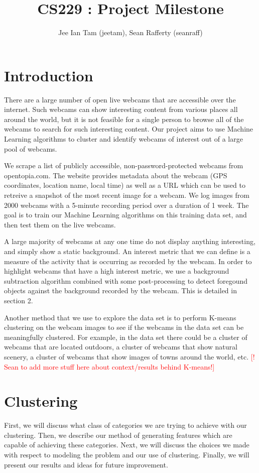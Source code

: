 \documentclass{article}
\begin{document}
\title{CS229 : Project Milestone}
\author{Jee Ian Tam (jeetam), Sean Rafferty (seanraff)}

\section{Introduction}
There are a large number of open live webcams that are accessible over the
internet. Such webcams can show interesting content from various places all
around the world, but it is not feasible for a single person to browse all of
the webcams to search for such interesting content. Our project aims to use
Machine Learning algorithms to cluster and identify webcams of interest out of
a large pool of webcams.

We scrape a list of publicly accessible, non-password-protected webcams from
opentopia.com. The website provides metadata about the webcam (GPS coordinates,
location name, local time) as well as a URL which can be used to retreive a
snapshot of the most recent image for a webcam. We log images from 2000 webcams
with a 5-minute recording period over a duration of 1 week. The goal is to
train our Machine Learning algorithms on this training data set, and then test
them on the live webcams.

A large majority of webcams at any one time do not display anything
interesting, and simply show a static background. An interest metric that we
can define is a measure of the activity that is occurring as recorded by the
webcam. In order to highlight webcams that have a high interest metric, we use
a background subtraction algorithm combined with some post-processing to detect
foregound objects against the background recorded by the webcam. This is
detailed in section 2.

Another method that we use to explore the data set is to perform K-means
clustering on the webcam images to see if the webcams in the data set can be
meaningfully clustered. For example, in the data set there could be a cluster
of webcams that are located outdoors, a cluster of webcams that show natural
scenery, a cluster of webcams that show images of towns around the world, etc.
\textcolor{red}{[! Sean to add more stuff here about context/results behind
K-means!]}

\section{Clustering}
First, we will discuss what class of categories we are trying to achieve with
our clustering. Then, we describe our method of generating features which are
capable of achieving these categories. Next, we will discuss the choices we
made with respect to modeling the problem and our use of clustering. Finally,
we will present our results and ideas for future improvement.
\end{document}
